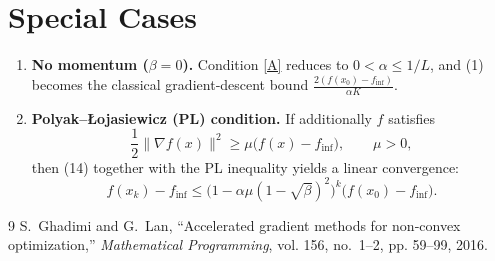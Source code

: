 \documentclass{article}
\begin{document}
\section*{Special Cases}
\begin{enumerate}[leftmargin=*]
\item \textbf{No momentum ($\beta=0$).}  Condition \eqref{A} reduces to $0<\alpha\le 1/L$, and (1) becomes the classical gradient‑descent bound $\frac{2(f(x_{0})-f_{\inf})}{\alpha K}$.
\item \textbf{Polyak–Łojasiewicz (PL) condition.}  If additionally $f$ satisfies
\[
\frac{1}{2}\|\nabla f(x)\|^{2}\ge \mu\bigl(f(x)-f_{\inf}\bigr),\qquad \mu>0,
\]
then (14) together with the PL inequality yields a linear convergence:
\[
f(x_{k})-f_{\inf}\le \bigl(1-\alpha\mu(1-\sqrt{\beta})^{2}\bigr)^{k}\bigl(f(x_{0})-f_{\inf}\bigr).
\]
\end{enumerate}

\begin{thebibliography}{9}
S.~Ghadimi and G.~Lan, ``Accelerated gradient methods for non‑convex
  optimization,'' \emph{Mathematical Programming}, vol. 156, no.~1–2,
  pp. 59–99, 2016.
\end{thebibliography}
\end{document}
